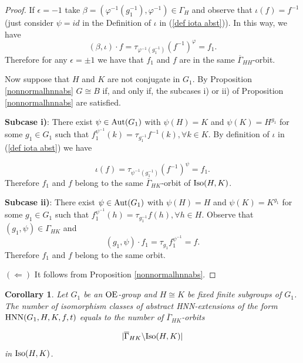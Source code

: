 \documentclass[a4paper,12pt]{article}
\newtheorem{cor}[thm]{Corollary}
\def\OE{{\rm OE}}
\def\aut {{\rm Aut}}
\def\hnn {{\rm HNN}}
\def\Iso {{\rm Iso}}
\begin{document}
{\begin{proof}
If $\epsilon=-1$ take $\beta=(\varphi^{-1}(g_1^{-1}), \varphi^{-1})\in \Gamma_{H}$ and observe that  $\iota(f)=f^{-1}$ (just consider $\psi=id$ in the Definition of $\iota$ in (\ref{def iota abst})). In this way, we have 
$$(\beta, \iota) \cdot f = \tau_{\varphi^{-1}(g_{1}^{-1})} \left( f^{-1}\right)^{\varphi}   =f_1.$$ %
Therefore for any $\epsilon=\pm 1$ we have that $f_1$ and $f$ are in the same $\overline\Gamma_{HH}$-orbit.



\medskip

Now suppose
that $H$ and $K$ are not conjugate in $G_1$. By Proposition \ref{nonnormalhnnabs} $G \cong B$ if, and only if, the subcases i) or ii) of Proposition \ref{nonnormalhnnabs} are satisfied. 

 \textbf{Subcase i)}: There exist $\psi\in \aut(G_1)$ with $\psi(H)=K $ and $ \psi(K)=H^{g_1}$ for some $g_1 \in G_1$ such that $f_1^{\psi^{-1}}(k)= \tau_{g_1^{-1}} f^{- 1}(k), \forall k \in K$. By definition of  $\iota$ in (\ref{def iota abst}) we have

$$\iota(f)=\tau_{\psi^{-1}(g_1^{-1})}(f^{-1})^{\psi}=f_1.$$
Therefore $f_1$ and $f$ belong to the same  $\overline{\Gamma}_{HK}$-orbit of $\Iso(H, K)$.

 \textbf{Subcase ii)}: There exist $\psi\in \aut(G_1)$ with $\psi(H)=H $ and $ \psi(K)=K^{g_1}$ for some $g_1 \in G_1$ such that $f_1^{\psi^{-1}}(h)= \tau_{g_1^{-1}} f(h), \forall h \in H$. Observe that $(g_1, \psi)\in \Gamma_{HK}$ and $$(g_1, \psi)\cdot f_1= \tau_{g_1}f_1^{\psi^{-1}}=f.$$
Therefore $f_1$ and $f$ belong to the same orbit.


 
\bigskip

\hspace{-0,8cm} $(\Leftarrow)$ It follows from Proposition   \ref{nonnormalhnnabs}. 
\end{proof}

\begin{cor}\label{number of isomorphisms} Let $G_1$ be an $\OE$-group and $H\cong K$ be fixed finite subgroups of $G_1$.
The number of isomorphism classes of abstract HNN-extensions of the form $\hnn(G_1, H, K, f, t)$  equals to the number of $\overline\Gamma_{HK}$-orbits 

\begin{equation}\label{formula numero hnn extensao}
|\overline{\Gamma}_{HK} \backslash \Iso(H, K)|
\end{equation}
in $\Iso(H, K)$.
\end{cor}


}
\end{document}

